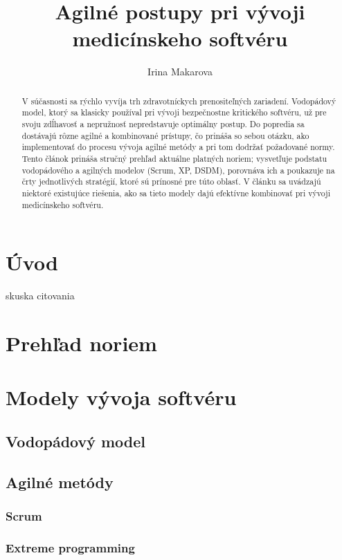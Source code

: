\documentclass[10pt,twoside,slovak,a4paper]{article}
\title{Agilné postupy pri vývoji medicínskeho softvéru}
\author{Irina Makarova\\[2pt]}
\date{}
\begin{document}
\renewcommand{\abstractname}{\vspace{-\baselineskip}} %
\maketitle

\begin{abstract}
V súčasnosti sa rýchlo vyvíja trh zdravotníckych prenositeľných zariadení. Vodopádový model, ktorý sa klasicky používal pri vývoji bezpečnostne kritického softvéru, už pre svoju zdĺhavosť a nepružnosť nepredstavuje optimálny postup. Do popredia sa dostávajú rôzne agilné a kombinované prístupy, čo prináša so sebou otázku, ako implementovať do procesu vývoja agilné metódy a pri tom dodržať požadované normy. Tento článok prináša stručný prehľad aktuálne platných noriem; vysvetľuje podstatu vodopádového a agilných modelov (Scrum, XP, DSDM), porovnáva ich a poukazuje na črty jednotlivých stratégií, ktoré sú prínosné pre túto oblasť. V článku sa uvádzajú niektoré existujúce riešenia, ako sa tieto modely dajú efektívne kombinovať pri vývoji medicínskeho softvéru.
\end{abstract}

\section{Úvod} \label{uvod}
skuska citovania\cite{mccaffery2019}
\section{Prehľad noriem}
\section{Modely vývoja softvéru}
\subsection{Vodopádový model}
\subsection{Agilné metódy}
\subsubsection{Scrum}
\subsubsection{Extreme programming}
\end{document}
